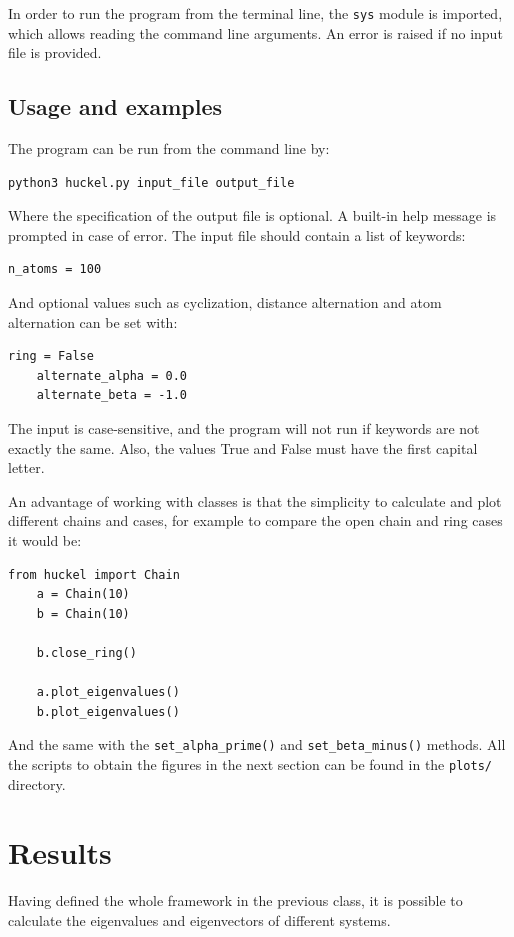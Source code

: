 \documentclass{article}
\begin{document}
In order to run the program from the terminal line, the \texttt{sys} module is imported, which allows reading the command line arguments. An error is raised if no input file is provided. 

\subsection{Usage and examples}
The program can be run from the command line by:
\begin{lstlisting}[backgroundcolor=\color{LightGray}]
    python3 huckel.py input_file output_file
\end{lstlisting} 
Where the specification of the output file is optional. A built-in help message is prompted in case of error. The input file should contain a list of keywords:

\begin{lstlisting}[backgroundcolor=\color{LightGray}]
    n_atoms = 100
\end{lstlisting} 
And optional values such as cyclization, distance alternation and atom alternation can be set with:
\begin{lstlisting}[backgroundcolor=\color{LightGray}]
    ring = False
    alternate_alpha = 0.0
    alternate_beta = -1.0
\end{lstlisting} 
The input is case-sensitive, and the program will not run if keywords are not exactly the same. Also, the values True and False must have the first capital letter.

An advantage of working with classes is that the simplicity to calculate and plot different chains and cases, for example to compare the open chain and ring cases it would be:
\begin{lstlisting}[backgroundcolor=\color{LightGray}]
    from huckel import Chain
    a = Chain(10)
    b = Chain(10)
    
    b.close_ring()
    
    a.plot_eigenvalues()
    b.plot_eigenvalues()
\end{lstlisting} 
And the same with the  \texttt{set\_alpha\_prime()} and \texttt{set\_beta\_minus()} methods. All the scripts to obtain the figures in the next section can be found in the \texttt{plots/} directory. 

\section{Results}
Having defined the whole framework in the previous class, it is possible to calculate the eigenvalues and eigenvectors of different systems. 
\end{document}
